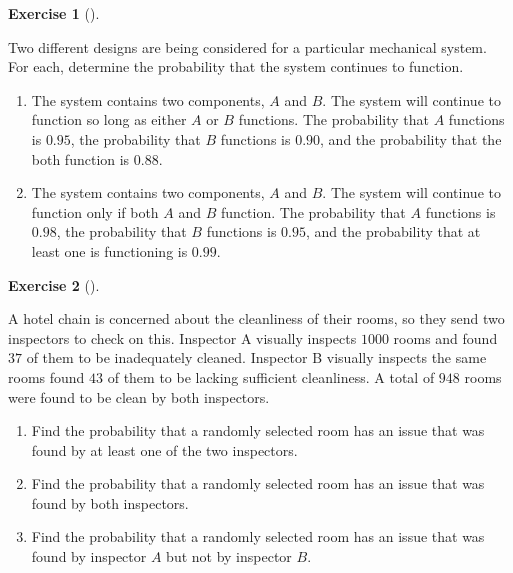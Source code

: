 \documentclass[
  letterpaper,
  DIV=11,
  numbers=noendperiod]{scrreprt}
\providecommand{\tightlist}{%
  \setlength{\itemsep}{0pt}\setlength{\parskip}{0pt}}\usepackage{longtable,booktabs,array}
\theoremstyle{definition}
\theoremstyle{definition}
\newtheorem{exercise}{Exercise}[chapter]
\theoremstyle{definition}
\theoremstyle{remark}
\begin{document}
\begin{exercise}[]\protect\hypertarget{exr-3.8}{}\label{exr-3.8}

Two different designs are being considered for a particular mechanical
system. For each, determine the probability that the system continues to
function.

\begin{enumerate}
\def\labelenumi{\alph{enumi}.}
\tightlist
\item
  The system contains two components, \(A\) and \(B\). The system will
  continue to function so long as either \(A\) or \(B\) functions. The
  probability that \(A\) functions is \(0.95\), the probability that
  \(B\) functions is \(0.90\), and the probability that the both
  function is \(0.88\).
\item
  The system contains two components, \(A\) and \(B\). The system will
  continue to function only if both \(A\) and \(B\) function. The
  probability that \(A\) functions is \(0.98\), the probability that
  \(B\) functions is \(0.95\), and the probability that at least one is
  functioning is \(0.99\).
\end{enumerate}

\end{exercise}

\begin{exercise}[]\protect\hypertarget{exr-3.9}{}\label{exr-3.9}

A hotel chain is concerned about the cleanliness of their rooms, so they
send two inspectors to check on this. Inspector A visually inspects
\(1000\) rooms and found \(37\) of them to be inadequately cleaned.
Inspector B visually inspects the same rooms found \(43\) of them to be
lacking sufficient cleanliness. A total of \(948\) rooms were found to
be clean by both inspectors.

\begin{enumerate}
\def\labelenumi{\alph{enumi}.}
\tightlist
\item
  Find the probability that a randomly selected room has an issue that
  was found by at least one of the two inspectors.
\item
  Find the probability that a randomly selected room has an issue that
  was found by both inspectors.
\item
  Find the probability that a randomly selected room has an issue that
  was found by inspector \(A\) but not by inspector \(B\).
\end{enumerate}

\end{exercise}
\end{document}
